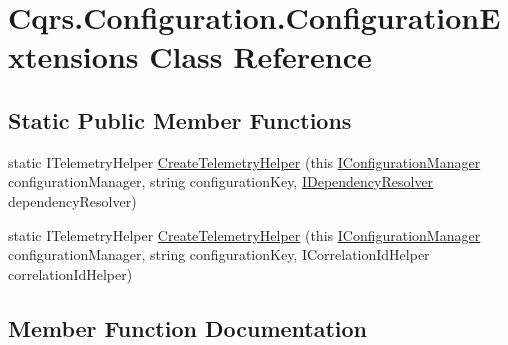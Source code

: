 \hypertarget{classCqrs_1_1Configuration_1_1ConfigurationExtensions}{}\section{Cqrs.\+Configuration.\+Configuration\+Extensions Class Reference}
\label{classCqrs_1_1Configuration_1_1ConfigurationExtensions}
\subsection*{Static Public Member Functions}
\begin{DoxyCompactItemize}
\item 
static I\+Telemetry\+Helper \hyperlink{classCqrs_1_1Configuration_1_1ConfigurationExtensions_aea6ef58f3c312c44a96985c033e7a9ae}{Create\+Telemetry\+Helper} (this \hyperlink{interfaceCqrs_1_1Configuration_1_1IConfigurationManager}{I\+Configuration\+Manager} configuration\+Manager, string configuration\+Key, \hyperlink{interfaceCqrs_1_1Configuration_1_1IDependencyResolver}{I\+Dependency\+Resolver} dependency\+Resolver)
\item 
static I\+Telemetry\+Helper \hyperlink{classCqrs_1_1Configuration_1_1ConfigurationExtensions_a5b4906550efcc42fd0904c23bd7ae685}{Create\+Telemetry\+Helper} (this \hyperlink{interfaceCqrs_1_1Configuration_1_1IConfigurationManager}{I\+Configuration\+Manager} configuration\+Manager, string configuration\+Key, I\+Correlation\+Id\+Helper correlation\+Id\+Helper)
\end{DoxyCompactItemize}


\subsection{Member Function Documentation}
\mbox{\label{classCqrs_1_1Configuration_1_1ConfigurationExtensions_aea6ef58f3c312c44a96985c033e7a9ae}} 
